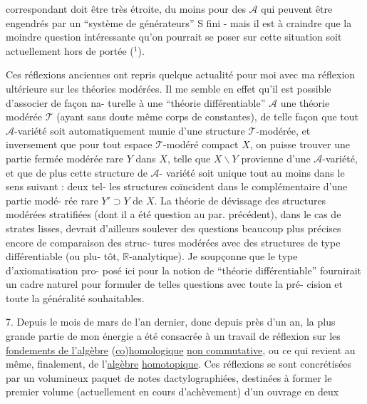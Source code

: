 
correspondant doit être très étroite, du moins pour des $\mathcal{A}$ qui
peuvent être engendrés par un ``système de générateurs'' S fini -
mais il est à craindre que la moindre question intéressante qu'on
pourrait se poser sur cette situation soit actuellement hors de
portée ($^1$).

Ces réflexions anciennes ont repris quelque actualité
pour moi avec ma réflexion ultérieure sur les théories modérées.
Il me semble en effet qu'il est possible d'associer de façon na-%
turelle à une ``théorie différentiable'' $\mathcal{A}$ une théorie modérée $\mathcal{T}$
(ayant sans doute même corps de constantes), de telle façon que
tout $\mathcal{A}$-variété soit automatiquement munie d'une structure $\mathcal{T}$-modérée,
et inversement que pour tout espace $\mathcal{T}$-modéré compact $X$, on puisse
trouver une partie fermée modérée rare $Y$ dans $X$, telle que $X \smallsetminus Y$
provienne d'une $\mathcal{A}$-variété, et que de plus cette structure de $\mathcal{A}$-%
variété soit unique tout au moins dans le sens suivant : deux tel-%
les structures coïncident dans le complémentaire d'une partie modé-%
rée rare $Y' \supset Y$ de $X$. La théorie de dévissage des structures
modérées stratifiées (dont il a été question au par. précédent),
dans le cas de strates lisses, devrait d'ailleurs soulever des
questions beaucoup plus précises encore de comparaison des struc-%
tures modérées avec des structures de type différentiable (ou plu-%
tôt, $\mathbb{R}$-analytique). Je soupçonne que le type d'axiomatisation pro-%
posé ici pour la notion de ``théorie différentiable'' fournirait un
cadre naturel pour formuler de telles questions avec toute la pré-%
cision et toute la généralité souhaitables.


7. Depuis le mois de mars de l'an dernier, donc depuis près
d'un an, la plus grande partie de mon énergie a été consacrée à un
travail de réflexion sur les \uline{fondements de l'algèbre} (\uline{co})\uline{homologique}
\uline{non commutative}, ou ce qui revient au même, finalement, de l'\uline{algèbre}
\uline{homotopique}. Ces réflexions se sont concrétisées par un volumineux
paquet de notes dactylographiées, destinées à former le premier
volume (actuellement en cours d'achèvement) d'un ouvrage en deux

